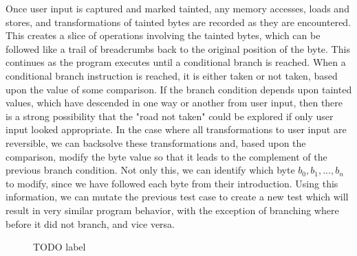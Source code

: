 \documentclass[11pt,expanded,copyright]{fsuthesis}
\begin{document}
Once user input is captured and marked tainted, any memory accesses, loads and stores, and transformations of tainted bytes are recorded as they are encountered. This creates a slice of operations involving the tainted bytes, which can be followed like a trail of breadcrumbs back to the original position of the byte. This continues as the program executes until a conditional branch is reached. When a conditional branch instruction is reached, it is either taken or not taken, based upon the value of some comparison. If the branch condition depends upon tainted values, which have descended in one way or another from user input, then there is a strong possibility that the "road not taken" could be explored if only user input looked appropriate. In the case where all transformations to user input are reversible, we can backsolve these transformations and, based upon the comparison, modify the byte value so that it leads to the complement of the previous branch condition. Not only this, we can identify which byte $b_0,b_1,...,b_n$ to modify, since we have followed each byte from their introduction. Using this information, we can mutate the previous test case to create a new test which will result in very similar program behavior, with the exception of branching where before it did not branch, and vice versa.

\begin{figure}
\caption{TODO label}
\end{figure}
\end{document}
